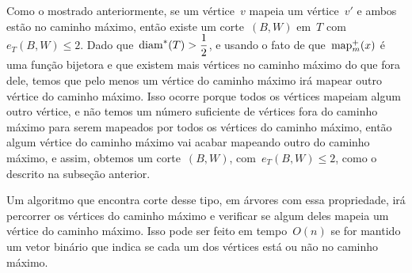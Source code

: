 	Como o mostrado anteriormente, se um vértice~$v$ mapeia um
	vértice~$v'$ e ambos estão no caminho máximo, então existe um
	corte~$(B,W)$ em~$T$ com~${e_T(B,W)\le 2}$.
	Dado que~${\mathrm{diam}^*(T)>\dfrac{1}{2}}$, e usando o fato de 
	que~$\mathrm{map}^+_m(x)$ é uma função bijetora e que
	existem mais vértices no caminho máximo do que fora dele,
	temos que pelo menos um vértice do caminho máximo irá mapear
	outro vértice do caminho máximo. Isso ocorre porque todos
	os vértices mapeiam algum outro vértice, e não temos um 
	número suficiente de vértices fora do caminho máximo para serem
	mapeados por todos os vértices do caminho máximo, então algum
	vértice do caminho máximo vai acabar mapeando outro do caminho
	máximo, e assim, obtemos um corte~$(B,W)$, com~$e_T(B,W)\le 2$,
	como o descrito na subseção anterior.

	Um algoritmo que encontra corte desse tipo, em árvores com 
	essa propriedade, irá percorrer os vértices do caminho máximo
	e verificar se algum deles mapeia um vértice do caminho máximo.
	Isso pode ser feito em tempo~$O(n)$ se for mantido um vetor 
	binário que indica se cada um dos vértices está ou não no
	caminho máximo.


